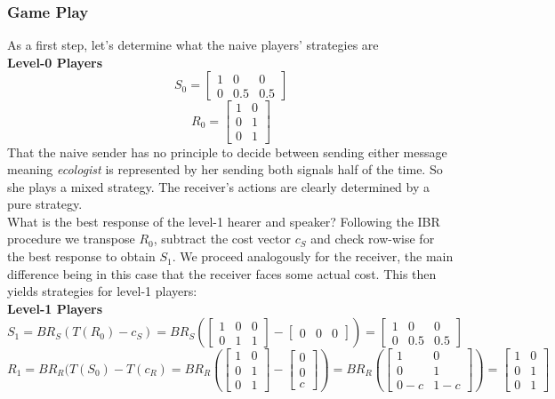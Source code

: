\documentclass[10]{article}
\begin{document}
\subsubsection{Game Play}
As a first step, let's determine what the naive players' strategies are\\
\textbf{Level-0 Players}\\
\begin{equation*}
S_0=
\begin{bmatrix}
1 & 0 & 0\\
0 & 0.5 & 0.5
\end{bmatrix}
\end{equation*}
\begin{equation*}
R_0=
\begin{bmatrix}
1 & 0\\
0 & 1\\
0 & 1
\end{bmatrix}
\end{equation*}
That the naive sender has no principle to decide between sending either message meaning \textit{ecologist} is represented by her sending both signals half of the time. So she plays a mixed strategy. The receiver's actions are clearly determined by a pure strategy.\\
What is the best response of the level-1 hearer and speaker? Following the IBR procedure we transpose $R_0$, subtract the cost vector $c_S$ and check row-wise for the best response to obtain $S_1$. We proceed analogously for the receiver, the main difference being in this case that the receiver faces some actual cost. This then yields strategies for level-1 players:\\
\textbf{Level-1 Players}\\
\begin{equation*}
S_1= BR_S(T(R_0)-c_S)=
BR_S(
\begin{bmatrix}
1 & 0 & 0\\
0 & 1 & 1
\end{bmatrix}
-
\begin{bmatrix}
0 & 0 & 0
\end{bmatrix}
)
=
\begin{bmatrix}
1 & 0 & 0\\
0 & 0.5 & 0.5
\end{bmatrix}
\end{equation*}
\begin{equation*}
R_1=BR_R(T(S_0)-T(c_R)=
BR_R(
\begin{bmatrix}
1 & 0\\
0 & 1\\
0 & 1
\end{bmatrix}
-
\begin{bmatrix}
0\\
0\\
c
\end{bmatrix}
)
=
BR_R(
\begin{bmatrix}
1 & 0\\
0 & 1\\
0-c & 1-c
\end{bmatrix}
)
=
\begin{bmatrix}
1 & 0\\
0 & 1\\
0 & 1
\end{bmatrix}
\end{equation*}
\end{document}
